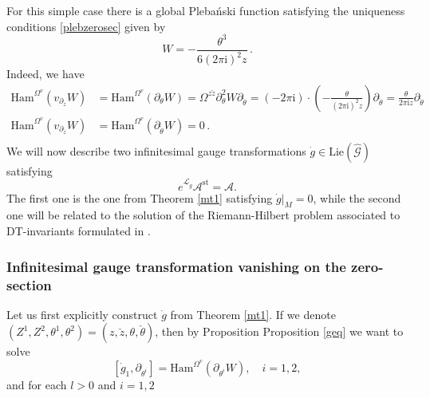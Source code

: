 \documentclass{article}
\theoremstyle{definition}
\numberwithin{equation}{section}
\begin{document}
For this simple case there is a global Pleba\'nski function satisfying the uniqueness conditions \eqref{plebzerosec} given by
\begin{equation}\label{A1pleb}
    W=-\frac{\theta^3}{6(2\pi \mathrm{i})^2z}\,.
\end{equation}
Indeed, we have
\begin{equation*}
\begin{split}
    \text{Ham}^{\Omega^v}(v_{\partial_z}W)&=\text{Ham}^{\Omega^v}(\partial_{\theta}W)=\Omega^{z\check{z}}\partial^2_{\theta}W\partial_{\check{\theta}}=(-2\pi \mathrm{i})\cdot \left(-\frac{\theta}{(2\pi \mathrm{i})^2z}\right)\partial_{\check{\theta}}=\frac{\theta}{2\pi \mathrm{i}z}\partial_{\check{\theta}}\,\\
    \text{Ham}^{\Omega^v}(v_{\partial_{\check{z}}}W)&=\text{Ham}^{\Omega^v}(\partial_{\check{\theta}}W)=0\,.\\
\end{split}
\end{equation*}
We will now describe two  infinitesimal gauge transformations $\dot{g}\in \text{Lie}(\widehat{\mathcal{G}})$ satisfying
\begin{equation*}
e^{\mathcal{L}_{\dot{g}}}\mathcal{A}^{\text{st}}=\mathcal{A}.
\end{equation*}
The first one is the one from Theorem \ref{mt1} satisfying $\dot{g}|_M=0$, while the second one will be related to the solution of the Riemann-Hilbert problem associated to DT-invariants formulated in \cite{varBPS}.
\subsubsection{Infinitesimal gauge transformation vanishing on the zero-section}
Let us first explicitly construct $\dot{g}$ from Theorem \ref{mt1}. If we denote $(Z^1,Z^2,\theta^1,\theta^2)=(z,\check{z},\theta,\check{\theta})$, then by Proposition Proposition \ref{geq} we want to solve \begin{equation}\label{A1eq1}
    [\dot{g}_1,\partial_{\theta^i}]=\text{Ham}^{\Omega^{v}}(\partial_{\theta^i}W), \quad i=1,2,
\end{equation}
and for each $l>0$ and  $i=1,2$
\end{document}

